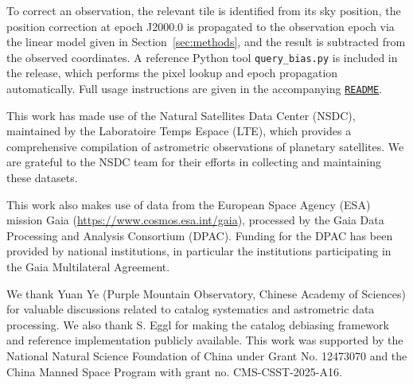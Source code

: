 \documentclass[linenumbers,amsmath,manuscript]{aastex702}
\begin{document}
To correct an observation, the relevant tile is identified from its sky position, the position correction at epoch J2000.0 is propagated to the observation epoch via the linear model given in Section~\ref{sec:methods}, and the result is subtracted from the observed coordinates. A reference Python tool \texttt{query\_bias.py} is included in the release, which performs the pixel lookup and epoch propagation automatically. Full usage instructions are given in the accompanying \href{https://nadc.china-vo.org/res/file_upload/download?id=1109148}{\texttt{README}}.

\clearpage

\onecolumngrid

\begin{acknowledgments}

This work has made use of the Natural Satellites Data Center (NSDC), maintained by the Laboratoire Temps Espace (LTE), which provides a comprehensive compilation of astrometric observations of planetary satellites. We are grateful to the NSDC team for their efforts in collecting and maintaining these datasets.

This work also makes use of data from the European Space Agency (ESA) mission Gaia (\url{https://www.cosmos.esa.int/gaia}), processed by the Gaia Data Processing and Analysis Consortium (DPAC). Funding for the DPAC has been provided by national institutions, in particular the institutions participating in the Gaia Multilateral Agreement.

We thank Yuan Ye (Purple Mountain Observatory, Chinese Academy of Sciences) for valuable discussions related to catalog systematics and astrometric data processing. We also thank S. Eggl for making the catalog debiasing framework and reference implementation publicly available. This work was supported by the National Natural Science Foundation of China under Grant No. 12473070 and the China Manned Space Program with grant no. CMS-CSST-2025-A16.
\end{acknowledgments}




\end{document}
